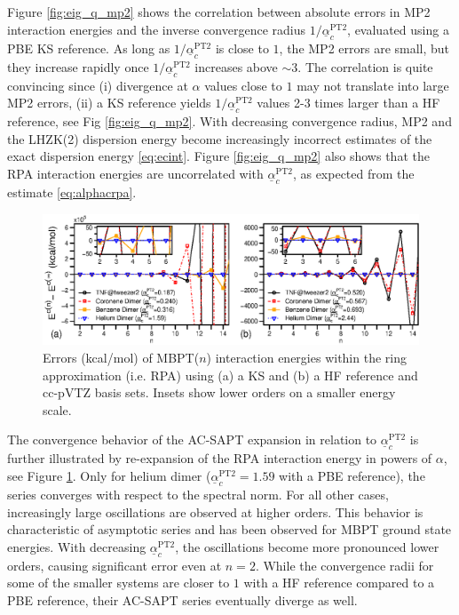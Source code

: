 \documentclass[journal=jctcce,manuscript=article]{achemso}
\begin{document}
Figure \ref{fig:eig_q_mp2} shows the correlation between absolute
errors in MP2 interaction energies and the inverse convergence radius $ 
1/\underline{\alpha}_c^{\text{PT2}}$, evaluated
using a PBE KS reference. As long as
$1/\underline{\alpha}_c^{\text{PT2}}$ is close to $1$, the MP2 errors are
small, but they increase rapidly once
$1/\underline{\alpha}_c^{\text{PT2}}$ increases above $\sim 3$. The
correlation is quite convincing since (i) divergence at $\alpha$ values
close to $1$ may not translate into large MP2 errors, (ii) a KS
reference yields $1/\underline{\alpha}_c^{\text{PT2}}$ values 2-3 times
larger than a HF reference, see Fig \ref{fig:eig_q_mp2}. With 
decreasing convergence radius, MP2 and the LHZK(2) dispersion
energy become increasingly incorrect estimates of the exact dispersion
energy \eqref{eq:ecint}. Figure \ref{fig:eig_q_mp2} also shows that the
RPA interaction energies are uncorrelated with
$\underline{\alpha}_c^{\text{PT2}}$, as expected from the estimate
\eqref{eq:alphacrpa}. 

\begin{figure}[hbtp]
  \centering
  \includegraphics{rpa_expand4.eps}
  \caption{Errors (kcal/mol) of MBPT($n$) interaction energies within
    the ring approximation (i.e. RPA) using (a) a KS and (b) a HF
    reference and cc-pVTZ 
    basis sets. Insets show lower orders on a smaller energy
    scale.} 
  \label{fig:rpa_expand}
\end{figure}

The convergence behavior of the AC-SAPT expansion in relation to
$\underline{\alpha}_c^{\text{PT2}}$
is further illustrated by
re-expansion of the RPA interaction energy in powers of $\alpha$, see
Figure \ref{fig:rpa_expand}. Only for helium dimer
($\underline{\alpha}_c^{\text{PT2}} = 1.59$ with a PBE reference), the
series converges with 
respect to the spectral norm. For all
other cases, increasingly large oscillations are observed at higher
orders. This behavior is characteristic of asymptotic series and has
been observed for MBPT ground state energies.\cite{kato2013perturbation,
  doi:10.1063/1.472352,doi:10.1063/1.481611}
With decreasing $\underline{\alpha}_c^{\text{PT2}}$, the oscillations become
more pronounced lower orders, causing significant error even at
$n=2$. While the convergence radii for some of the smaller systems
are closer to $1$ with a HF reference compared to a PBE reference, their
AC-SAPT series eventually diverge as well.
\end{document}
